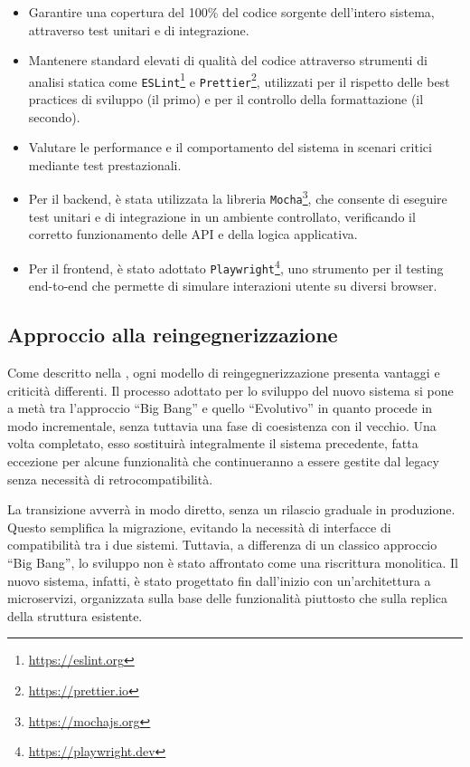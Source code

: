 \begin{itemize}
  \item Garantire una copertura del 100\% del codice sorgente dell'intero sistema, attraverso test unitari e di integrazione.
  \item Mantenere standard elevati di qualità del codice attraverso strumenti di analisi statica come \texttt{ESLint}\footnote{\url{https://eslint.org}} e \texttt{Prettier}\footnote{\url{https://prettier.io}}, utilizzati per il rispetto delle best practices di sviluppo (il primo) e per il controllo della formattazione (il secondo).
  \item Valutare le performance e il comportamento del sistema in scenari critici mediante test prestazionali.
  \item Per il backend, è stata utilizzata la libreria \texttt{Mocha}\footnote{\url{https://mochajs.org}}, che consente di eseguire test unitari e di integrazione in un ambiente controllato, verificando il corretto funzionamento delle API e della logica applicativa.
  \item Per il frontend, è stato adottato \texttt{Playwright}\footnote{\url{https://playwright.dev}}, uno strumento per il testing end-to-end che permette di simulare interazioni utente su diversi browser.
\end{itemize}

\subsection{Approccio alla reingegnerizzazione}
Come descritto nella , ogni modello di reingegnerizzazione presenta vantaggi e criticità differenti. Il processo adottato per lo sviluppo del nuovo sistema si pone a metà tra l'approccio ``Big Bang'' e quello ``Evolutivo'' in quanto procede in modo incrementale, senza tuttavia una fase di coesistenza con il vecchio. Una volta completato, esso sostituirà integralmente il sistema precedente, fatta eccezione per alcune funzionalità che continueranno a essere gestite dal legacy senza necessità di retrocompatibilità.

La transizione avverrà in modo diretto, senza un rilascio graduale in produzione. Questo semplifica la migrazione, evitando la necessità di interfacce di compatibilità tra i due sistemi. Tuttavia, a differenza di un classico approccio ``Big Bang'', lo sviluppo non è stato affrontato come una riscrittura monolitica. Il nuovo sistema, infatti, è stato progettato fin dall'inizio con un'architettura a microservizi, organizzata sulla base delle funzionalità piuttosto che sulla replica della struttura esistente.


